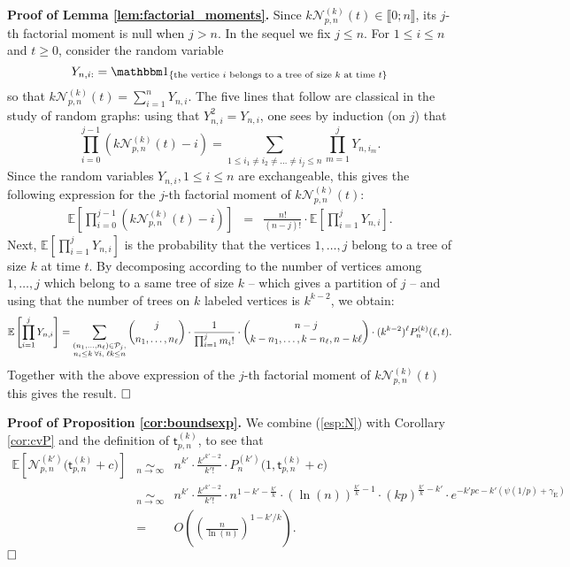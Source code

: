 \documentclass[a4, 11pt]{article}
\numberwithin{equation}{section}
\theoremstyle{plain}
\theoremstyle{definition}
\theoremstyle{remark}
\begin{document}
\bigskip

\textbf{Proof of Lemma \ref{lem:factorial_moments}.}
Since $k\mathcal N_{p,n}^{(k)}(t) \in \llbracket 0;n \rrbracket$, its $j$-th factorial moment is null when $j>n$. In the sequel we fix $j\leq n$.
For  $1 \leq i \leq n$ and $t\geq 0$, consider the random variable $$Y_{n,i:}=\mathbbm 1_{\{\text{the vertice } i \text{ belongs to a tree of size $k$ at time } t\}}$$
so that $k\mathcal N_{p,n}^{(k)}(t)=\sum_{i=1}^n Y_{n,i}$. The five lines that follow are classical in the study of random graphs:
using that $Y_{n,i}^2=Y_{n,i}$, one sees by induction (on $j$) that
$$
\prod_{i=0}^{j-1}(k\mathcal N_{p,n}^{(k)}(t)-i)=\sum_{1 \leq i_1 \neq i_2 \neq \ldots \neq i_j \leq n} \prod_{m=1}^j Y_{n,i_m}.
$$
Since the random variables $Y_{n,i}, 1 \leq i \leq n$ are exchangeable, this gives the following expression for the $j$-th factorial moment of $k\mathcal N_{p,n}^{(k)}(t)$:
\begin{eqnarray*}
\mathbb E\left[\prod_{i=0}^{j-1}(k\mathcal N_{p,n}^{(k)}(t)-i) \right]&=& \frac{n!}{(n-j)!}\cdot \mathbb E\left[\prod_{i=1}^j Y_{n,i}\right].
\end{eqnarray*}
Next, $\mathbb E\left[\prod_{i=1}^j Y_{n,i}\right]$ is the probability that the vertices $1,\ldots,j$ belong to a tree of size $k$ at time $t$. By decomposing according to the number of vertices among $1,\ldots, j$ which belong to a same tree of size $k$ -- which gives a partition of $j$ -- and using that the number of trees on  $k$ labeled vertices is $k^{k-2}$, we obtain:
\begin{equation*}
 \mathbb E\left[\prod_{i=1}^j Y_{n,i}\right] = \sum_{\substack{(n_1,\ldots,n_{\ell}) \in \mathcal P_j, \\ n_i \leq k \: \forall i, \; \ell k\leq n}} \binom{j}{n_1,\ldots,n_{\ell}} \cdot \frac{1}{\prod_{i=1}^j m_i!} \cdot \binom{n-j}{k-n_1,\ldots,k-n_\ell, n-k\ell} \cdot (k^{k-2})^{\ell} P^{(k)}_n(\ell,t).\\
\end{equation*}
Together with the above expression of the $j$-th factorial moment of $k\mathcal N_{p,n}^{(k)}(t)$ this gives the result.
$\hfill \square$

\bigskip


\textbf{Proof of Proposition \ref{cor:boundsexp}.}
We combine (\ref{esp:N}) with Corollary \ref{cor:cvP} and the definition of $\mathsf t^{(k)}_{p,n}$, to see that 
\begin{eqnarray*}
\mathbb E\left[\mathcal N_{p,n}^{(k')}\big(\mathsf t^{(k)}_{p,n}+c \big)\right] &\underset{n\rightarrow \infty}\sim& n^{k'} \cdot \frac{k'^{k'-2}}{k'!} \cdot P_n^{(k')}\big(1,\mathsf t^{(k)}_{p,n}+c \big) \\
&\underset{n\rightarrow \infty} \sim & n^{k'} \cdot \frac{k'^{k'-2}}{k'!} \cdot n^{1-k'-\frac{k'}{k}} \cdot (\ln(n))^{\frac{k'}{k}-1} \cdot  (kp)^{\frac{k'}{k}-k'} \cdot e^{- k' p c-k' \left(\psi(1/p)+\gamma_{\mathrm E}\right)} \\
&=& O \left( \left(\frac{n}{\ln(n)} \right)^{1-k'/k} \right).
\end{eqnarray*}
$\hfill \square$
\end{document}
